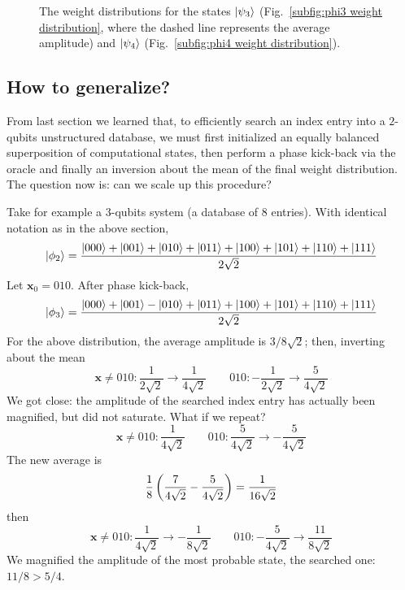 \begin{figure}
	\centering
	\caption{The weight distributions for the states $\ket{\psi_3}$ (Fig.~\ref{subfig:phi3 weight distribution}, where the dashed line represents the average amplitude) and $\ket{\psi_4}$ (Fig.~\ref{subfig:phi4 weight distribution}).}
	\label{fig:phi3-4 weight distribution}
\end{figure}

\subsection{How to generalize?}

From last section we learned that, to efficiently search an index entry into a $2$-qubits unstructured database, we must first initialized an equally balanced superposition of computational states, then perform a phase kick-back via the oracle and finally an inversion about the mean of the final weight distribution. The question now is: can we scale up this procedure?

Take for example a $3$-qubits system (a database of $8$ entries). With identical notation as in the above section,
\[
	\ket{\phi_2} = \frac{\ket{000}+\ket{001}+\ket{010}+\ket{011}+\ket{100}+\ket{101}+\ket{110}+\ket{111}}{2\sqrt{2}}
\]
Let $\mathbf{x}_0 = 010$. After phase kick-back,
\[
	\ket{\phi_3} = \frac{\ket{000}+\ket{001}-\ket{010}+\ket{011}+\ket{100}+\ket{101}+\ket{110}+\ket{111}}{2\sqrt{2}}
\]
For the above distribution, the average amplitude is $3/8\sqrt{2}$; then, inverting about the mean
\[
	\mathbf{x} \neq 010 \colon
	\frac{1}{2\sqrt{2}} \to \frac{1}{4\sqrt{2}}
	\qquad
	010 \colon
	- \frac{1}{2\sqrt{2}} \to \frac{5}{4\sqrt{2}}
\]
We got close: the amplitude of the searched index entry has actually been magnified, but did not saturate. What if we repeat?
\[
	\mathbf{x} \neq 010 \colon \frac{1}{4\sqrt{2}}
	\qquad
	010 \colon
	\frac{5}{4\sqrt{2}} \to - \frac{5}{4\sqrt{2}}
\]
The new average is
\[
	\frac{1}{8} \left({\frac{7}{4\sqrt{2}} - \frac{5}{4\sqrt{2}}}\right) = \frac{1}{16 \sqrt{2}}
\]
then
\[
	\mathbf{x} \neq 010 \colon
	\frac{1}{4\sqrt{2}} \to -\frac{1}{8\sqrt{2}}
	\qquad
	010 \colon
	-\frac{5}{4\sqrt{2}} \to \frac{11}{8\sqrt{2}}
\]
We magnified the amplitude of the most probable state, the searched one: $11/8 > 5/4$.

